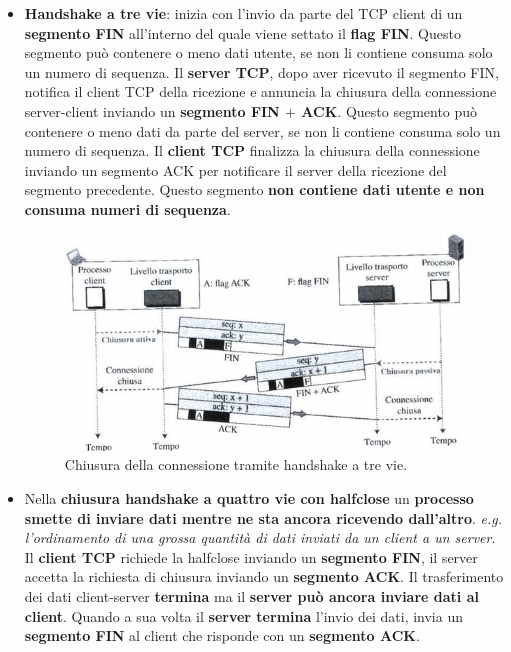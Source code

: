 \documentclass[11pt,a4paper,oneside]{book}
\theoremstyle{definition}
\begin{document}
\begin{itemize}
	\item \textbf{Handshake a tre vie}: inizia con l'invio da parte del TCP client
	      di un \textbf{segmento FIN} all'interno del quale viene settato il \textbf{flag FIN}. Questo segmento può contenere o meno dati utente, se non li contiene consuma solo un numero di sequenza.
	      Il \textbf{server TCP}, dopo aver ricevuto il segmento FIN, notifica il client TCP della ricezione e annuncia la chiusura della connessione server-client inviando un \textbf{segmento FIN $+$ ACK}. Questo segmento può contenere o meno dati da parte del server, se non li contiene consuma solo un numero di sequenza.
	      Il \textbf{client TCP} finalizza la chiusura della connessione inviando un segmento ACK per notificare il server della ricezione del segmento precedente. Questo segmento \textbf{non contiene dati utente e non consuma numeri di sequenza}.
	      \begin{figure}[!h]
		      \includegraphics[scale=0.5]{Immagini/Three_wayc.png}
		      \centering
		      \caption{Chiusura della connessione tramite handshake a tre vie.}
	      \end{figure}
	\item Nella \textbf{chiusura handshake a quattro vie con halfclose} un \textbf{processo smette di inviare dati mentre ne sta ancora ricevendo dall'altro}.\textit{ e.g. l'ordinamento di una grossa quantità di dati inviati da un client a un server}. Il \textbf{client TCP} richiede la halfclose inviando un \textbf{segmento FIN}, il server accetta la richiesta di chiusura inviando un \textbf{segmento ACK}. Il trasferimento dei dati client-server \textbf{termina} ma il \textbf{server può ancora inviare dati al client}. Quando a sua volta il \textbf{server termina} l'invio dei dati, invia un \textbf{segmento FIN} al client che risponde con un \textbf{segmento ACK}.
\end{itemize}
\end{document}
